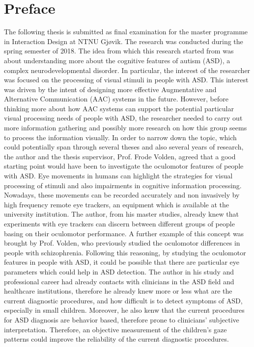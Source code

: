 \hypersetup{pageanchor=false}
%

\chapter*{Preface}
The following thesis is submitted as final examination for the master programme in Interaction Design at NTNU Gjøvik. The research was conducted during the spring semester of 2018.
The idea from which this research started from was about understanding more about the cognitive features of autism (ASD), a complex neurodevelopmental disorder. In particular, the interest of the researcher was focused on the processing of visual stimuli in people with ASD. This interest was driven by the intent of designing more effective Augmentative and Alternative Communication (AAC) systems in the future. However, before thinking more about how AAC systems can support the potential particular visual processing needs of people with ASD, the researcher needed to carry out more information gathering and possibly more research on how this group seems to process the information visually.
In order to narrow down the topic, which could potentially span through several theses and also several years of research, the author and the thesis supervisor, Prof. Frode Volden, agreed that a good starting point would have been to investigate the oculomotor features of people with ASD. Eye movements in humans can highlight the strategies for visual processing of stimuli and also impairments in cognitive information processing. Nowadays, these movements can be recorded accurately and non invasively by high frequency remote eye trackers, an equipment which is available at the university institution.
The author, from his master studies, already knew that experiments with eye trackers can discern between different groups of people basing on their oculomotor performance. A further example of this concept was brought by Prof. Volden, who previously studied the oculomotor differences in people with schizophrenia. Following this reasoning, by studying the oculomotor features in people with ASD, it could be possible that there are particular eye parameters which could help in ASD detection.
The author in his study and professional career had already contacts with clinicians in the ASD field and healthcare institutions, therefore he already knew more or less what are the current diagnostic procedures, and how difficult is to detect symptoms of ASD, especially in small children. Moreover, he also kenw that the current procedures for ASD diagnosis are behavior based, therefore prone to clinicians' subjective interpretation. Therefore, an objective measurement of the children's gaze patterns could improve the reliability of the current diagnostic procedures.
